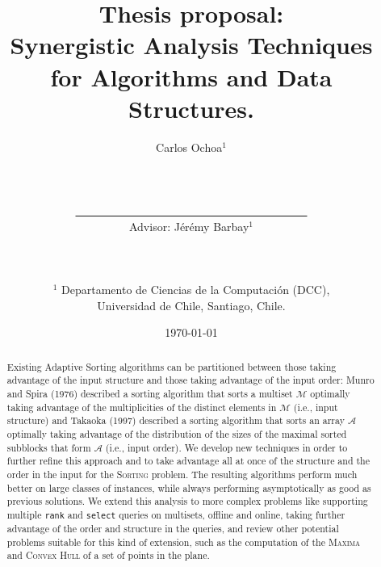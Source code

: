 \documentclass[10pt]{article}
\title{Thesis proposal: \\Synergistic Analysis Techniques\\ for Algorithms and Data Structures.}
\author{Carlos Ochoa$^{1}$
  \\\\\\\\\underline{\ \ \ \ \ \ \ \ \ \ \ \ \ \ \ \ \ \ \ \ \ \ \ \ \
    \ \ \ \ \ \ \ \ \ \ \ \ \ \ \ \ }
  \\Advisor: J\'er\'emy Barbay$^1$\\\\\\\\
  $^1$ Departamento de Ciencias de la Computaci\'on (DCC),\\ Universidad de Chile, Santiago, Chile.
}
\date{\today}
\begin{document}
\maketitle
\begin{abstract}
  Existing Adaptive Sorting algorithms can be partitioned between
  those taking advantage of the input structure and those taking
  advantage of the input order: Munro and Spira (1976) described a
  sorting algorithm that sorts a multiset $\mathcal{M}$ optimally
  taking advantage of the multiplicities of the distinct elements in
  $\mathcal{M}$ (i.e., input structure) and Takaoka (1997) described a
  sorting algorithm that sorts an array $\mathcal{A}$ optimally taking
  advantage of the distribution of the sizes of the maximal sorted
  subblocks that form $\mathcal{A}$ (i.e., input order). We develop
  new techniques in order to further refine this approach and to take
  advantage all at once of the structure and the order in the input
  for the \textsc{Sorting} problem. The resulting algorithms perform
  much better on large classes of instances, while always performing
  asymptotically as good as previous solutions. We extend this
  analysis to more complex problems like supporting multiple
  \texttt{rank} and \texttt{select} queries on multisets, offline and
  online, taking further advantage of the order and structure in the
  queries, and review other potential problems suitable for this kind
  of extension, such as the computation of the \textsc{Maxima} and
  \textsc{Convex Hull} of a set of points in the plane.
\end{abstract}
\clearpage



\newpage



\end{document}

